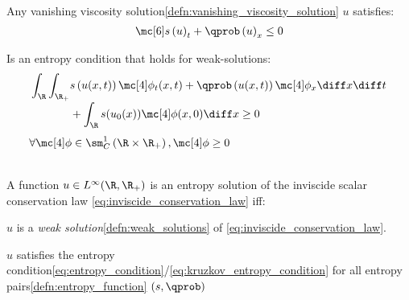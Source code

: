 \begin{defnbox}\nospacing
    \begin{defn}\label{defn:entropy_condition}\leavevmode\\
        Any vanishing viscosity solution\cref{defn:vanishing_viscosity_solution} $u$ satisfies:
        \begin{align}
          \entropy\left(u\right)_{t}+\qprob\left(u\right)_{x}\leq0\label{eq:entropy_condition}
        \end{align}
    \end{defn}
\end{defnbox}
\begin{corbox}\nospacing
    \begin{cor}\label{cor:entropy_condition_for_distributions}
        Is an entropy condition that holds for weak-solutions:
          \begin{align}
            \int_{\R}\int_{\R_{+}}&s \left(u(x,t)\right)\testfunc_{t}(x,t)+\qprob \left(u(x,t)\right)\testfunc_{x}\diff x\diff t\nonumber \\[-1\jot]
            &+\int_{\R}s(u_{0}(x))\testfunc(x,0)\diff x\geq0\label{eq:kruzkov_entropy_condition}
          \end{align}
          \hfill$\qquad\forall\testfunc\in\sm_{C}^{1}\left(\R\times\R_{+}\right),\testfunc\geq0\nonumber$
    \end{cor}
\end{corbox}
\begin{defnbox}\nospacing
    \begin{defn}\label{defn:entropy_solution}\leavevmode\\
        A function $u\in L^{\infty}(\R,\R_{+})$ is an entropy solution of the inviscide scalar conservation law \cref{eq:inviscide_conservation_law} iff:
        \begin{circlelistnosep}
            \item $u$ is a \textit{weak solution}\cref{defn:weak_solutions} of \cref{eq:inviscide_conservation_law}.
            \item $u$ satisfies the entropy condition\cref{eq:entropy_condition}/\cref{eq:kruzkov_entropy_condition} for all entropy pairs\cref{defn:entropy_function} $(s,\qprob)$
        \end{circlelistnosep}
    \end{defn}
\end{defnbox}
